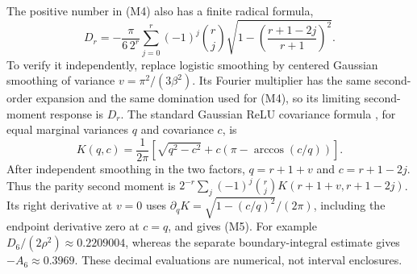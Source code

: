 \documentclass[11pt]{article}
\begin{document}
The positive number in (M4) also has a finite radical formula,
\[
 D_r=-\frac{\pi}{6\,2^r}\sum_{j=0}^r(-1)^j\binom rj
             \sqrt{1-\left(\frac{r+1-2j}{r+1}\right)^2}.
                                                               \tag{M5}
\]
To verify it independently, replace logistic smoothing by centered
Gaussian smoothing of variance $v=\pi^2/(3\beta^2)$.
Its Fourier multiplier has the same second-order expansion and the
same domination used for (M4), so its limiting second-moment response
is $D_r$. The standard Gaussian ReLU covariance formula
\cite{cho-saul}, for equal marginal variances $q$ and covariance $c$, is
\[
 K(q,c)=\frac1{2\pi}
       [\sqrt{q^2-c^2}+c(\pi-\arccos(c/q))].
\]
After independent smoothing in the two factors, $q=r+1+v$ and
$c=r+1-2j$. Thus the parity second moment is
$2^{-r}\sum_j(-1)^j\binom rj K(r+1+v,r+1-2j)$.
Its right derivative at $v=0$ uses
$\partial_qK=\sqrt{1-(c/q)^2}/(2\pi)$, including the endpoint
derivative zero at $c=q$, and gives (M5).
For example $D_6/(2\rho^2)\approx0.2209004$, whereas the separate
boundary-integral estimate gives $-A_6\approx0.3969$.
These decimal evaluations are numerical, not interval enclosures.
\end{document}
